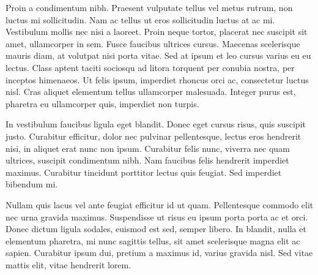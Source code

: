 Proin a condimentum nibh. Praesent vulputate tellus vel metus rutrum, non luctus mi sollicitudin. Nam ac tellus ut eros sollicitudin luctus at ac mi. Vestibulum mollis nec nisi a laoreet. Proin neque tortor, placerat nec suscipit sit amet, ullamcorper in sem. Fusce faucibus ultrices cursus. Maecenas scelerisque mauris diam, at volutpat nisi porta vitae. Sed at ipsum et leo cursus varius eu eu lectus. Class aptent taciti sociosqu ad litora torquent per conubia nostra, per inceptos himenaeos. Ut felis ipsum, imperdiet rhoncus orci ac, consectetur luctus nisl. Cras aliquet elementum tellus ullamcorper malesuada. Integer purus est, pharetra eu ullamcorper quis, imperdiet non turpis.

In vestibulum faucibus ligula eget blandit. Donec eget cursus risus, quis suscipit justo. Curabitur efficitur, dolor nec pulvinar pellentesque, lectus eros hendrerit nisi, in aliquet erat nunc non ipsum. Curabitur felis nunc, viverra nec quam ultrices, suscipit condimentum nibh. Nam faucibus felis hendrerit imperdiet maximus. Curabitur tincidunt porttitor lectus quis feugiat. Sed imperdiet bibendum mi.

Nullam quis lacus vel ante feugiat efficitur id ut quam. Pellentesque commodo elit nec urna gravida maximus. Suspendisse ut risus eu ipsum porta porta ac et orci. Donec dictum ligula sodales, euismod est sed, semper libero. In blandit, nulla et elementum pharetra, mi nunc sagittis tellus, sit amet scelerisque magna elit ac sapien. Curabitur ipsum dui, pretium a maximus id, varius gravida nisl. Sed vitae mattis elit, vitae hendrerit lorem. 
